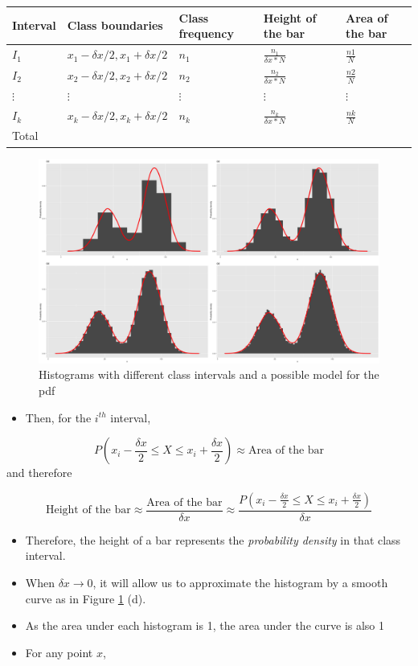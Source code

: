 \documentclass[]{book}
\providecommand{\tightlist}{%
  \setlength{\itemsep}{0pt}\setlength{\parskip}{0pt}}
\begin{document}
\begin{longtable}[]{@{}lllll@{}}
\toprule
Interval & Class boundaries & Class frequency & Height of the bar & Area of the bar\tabularnewline
\midrule
\endhead
\(I_1\) & \(x_1 -\delta x/2, x_1+\delta x/2\) & \(n_1\) & \(\frac{n_1}{\delta x*N}\) & \(\frac{n1}{N}\)\tabularnewline
\(I_2\) & \(x_2 -\delta x/2, x_2+\delta x/2\) & \(n_2\) & \(\frac{n_2}{\delta x*N}\) & \(\frac{n2}{N}\)\tabularnewline
\(\vdots\) & \(\vdots\) & \(\vdots\) & \(\vdots\) & \(\vdots\)\tabularnewline
\(I_k\) & \(x_k -\delta x/2, x_k+\delta x/2\) & \(n_k\) & \(\frac{n_k}{\delta x*N}\) & \(\frac{nk}{N}\)\tabularnewline
Total & & & &\tabularnewline
\bottomrule
\end{longtable}

\begin{figure}

{\centering \includegraphics{figure/hist-1} 

}

\caption{Histograms with different class intervals and a possible model for the pdf}\label{fig:hist}
\end{figure}

\begin{itemize}
\tightlist
\item
  Then, for the \(i^{th}\) interval,
\end{itemize}

\[P(x_i - \frac{\delta x}{2} \leq X \leq x_i + \frac{\delta x}{2}) \approx \text{Area of the bar} \]
and therefore

\[\text{Height of the bar} \approx \frac{\text{Area of the bar}}{\delta x} \approx \frac{ P(x_i - \frac{\delta x}{2} \leq X \leq x_i + \frac{\delta x}{2})}{\delta x}  \]

\begin{itemize}
\item
  Therefore, the height of a bar represents the \emph{probability density} in that class interval.
\item
  When \(\delta x \rightarrow0\), it will allow us to approximate the histogram by a smooth curve as in Figure \ref{fig:hist} (d).
\item
  As the area under each histogram is 1, the area under the curve is also 1
\item
  For any point \(x\),
\end{itemize}
\end{document}

